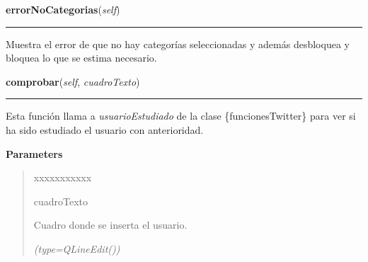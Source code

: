     \vspace{0.5ex}

\hspace{.8\funcindent}\begin{boxedminipage}{\funcwidth}

    \raggedright \textbf{errorNoCategorias}(\textit{self})

    \vspace{-1.5ex}

    \rule{\textwidth}{0.5\fboxrule}
\setlength{\parskip}{2ex}
    Muestra el error de que no hay categorías seleccionadas y además 
    desbloquea y bloquea lo que se estima necesario.

\setlength{\parskip}{1ex}
    \end{boxedminipage}

    \label{manejoGrafico:ManejoGrafico:comprobar}

    \vspace{0.5ex}

\hspace{.8\funcindent}\begin{boxedminipage}{\funcwidth}

    \raggedright \textbf{comprobar}(\textit{self}, \textit{cuadroTexto})

    \vspace{-1.5ex}

    \rule{\textwidth}{0.5\fboxrule}
\setlength{\parskip}{2ex}
    Esta función llama a \textit{usuarioEstudiado} de la clase 
    \{funcionesTwitter\} para ver si ha sido estudiado el usuario con 
    anterioridad.

\setlength{\parskip}{1ex}
      \textbf{Parameters}
      \vspace{-1ex}

      \begin{quote}
        \begin{Ventry}{xxxxxxxxxxx}

          \item[cuadroTexto]

          Cuadro donde se inserta el usuario.

            {\it (type=QLineEdit())}

        \end{Ventry}

      \end{quote}

    \end{boxedminipage}

